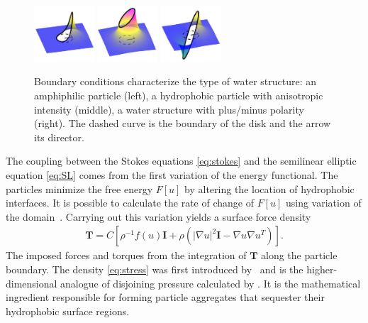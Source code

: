 \begin{figure}
  \vspace{-22pt}
  \includegraphics[width=0.2\textwidth]{figures/SpecificAim1/LPA.pdf}
  \includegraphics[width=0.2\textwidth]{figures/SpecificAim1/LPB.pdf}
  \includegraphics[width=0.2\textwidth]{figures/SpecificAim1/LPC.pdf}  
\caption{\label{fig:bcs} Boundary conditions characterize the type of
  water structure: an amphiphilic particle (left), a hydrophobic
  particle with anisotropic intensity (middle), a water structure with
  plus/minus polarity (right). The dashed curve is the boundary of the
  disk and the arrow its director.}
\end{figure}
The coupling between the Stokes equations \eqref{eq:stokes} and the
semilinear elliptic equation \eqref{eq:SL} comes from the first
variation of the energy functional.  The particles minimize the free
energy $F[u]$ by altering the location of hydrophobic interfaces.  It is
possible to calculate the rate of change of $F[u]$ using variation of
the domain~\cite{Bandle2015, Schiffer1954, Grinfeld2010}.  Carrying out
this variation yields a 
surface force density 
\begin{align}
  \label{eq:stress}
\mathbf{T}
= C \left[ \rho^{-1} f(u) \mathbf{I}
  + \rho  \left(|\nabla u|^2 \mathbf{I} - \nabla u  \nabla u^T\right)\right].
\end{align}
The imposed forces and torques from the integration of $\mathbf{T}$ along the
particle boundary.
The density \eqref{eq:stress}  was first introduced
by~\cite{Fu2018_SIAM} and is the higher-dimensional analogue of
disjoining pressure calculated by
\cite{MaRa76, ErLjCl89, KoNa15, Nagle17, KUZMIN2005}.
It is the mathematical ingredient responsible for forming particle
aggregates that sequester their hydrophobic surface regions.

